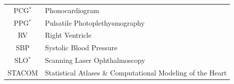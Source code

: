 \documentclass[journal]{IEEEtran}
\begin{document}
\begin{table}[!t]
\begin{minipage}{0.5\textwidth}
\begin{tabularx}{\textwidth}{c l}
			PCG$^*$                                                                                                                                                          & Phonocardiogram                                            \\
			PPG$^*$                                                                                                                                                          & Pulsatile Photoplethysmography                             \\
			RV                                                                                                                                                               & Right Ventricle                                            \\
			SBP                                                                                                                                                              & Systolic Blood Pressure                                    \\
			SLO$^*$                                                                                                                                                          & Scanning Laser Ophthalmoscopy                               \\
			STACOM                                                                                                                                                           & Statistical Atlases \& Computational Modeling of the Heart \\
			\bottomrule
		\end{tabularx}
	\end{minipage}
\end{table}
\end{document}

